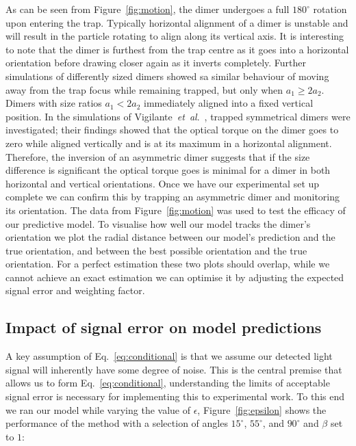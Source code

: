 \documentclass[final, 3p]{elsarticle}
\begin{document}
As can be seen from Figure~\ref{fig:motion}, the dimer undergoes a full $180^{\circ}$ rotation upon entering the trap.  Typically horizontal alignment of a dimer is unstable and will result in the particle rotating to align along its vertical axis.  It is interesting to note that the dimer is furthest from the trap centre as it goes into a horizontal orientation before drawing closer again as it inverts completely. Further simulations of differently sized dimers showed sa similar behaviour of moving away from the trap focus while remaining trapped, but only when $a_1 \geq 2a_2$.  Dimers with size ratios $a_1 < 2a_2$ immediately aligned into a fixed vertical position.
%
In the simulations of Vigilante~\emph{et~al}.\ \cite{Vigilante2020Brownian_OT}, trapped symmetrical dimers were investigated; their findings showed that the optical torque on the dimer goes to zero while aligned vertically and is at its maximum in a horizontal alignment.  Therefore, the inversion of an asymmetric dimer suggests that if the size difference is significant the optical torque goes is minimal for a dimer in both horizontal and vertical orientations. Once we have our experimental set up complete we can confirm this by trapping an asymmetric dimer and monitoring its orientation.  The data from Figure~\ref{fig:motion} was used to test the efficacy of our predictive model.  To visualise how well our model tracks the dimer's orientation we plot the radial distance between our model's prediction and the true orientation, and between the best possible orientation and the true orientation.  For a perfect estimation these two plots should overlap, while we cannot achieve an exact estimation we can optimise it by adjusting the expected signal error and weighting factor.


\subsection{Impact of signal error on model predictions}
\label{sec:epsilon}

A key assumption of Eq.~\eqref{eq:conditional} is that we assume our detected light signal will inherently have some degree of noise. This is the central premise that allows us to form Eq.~\eqref{eq:conditional}, understanding the limits of acceptable signal error is necessary for implementing this to experimental work. To this end we ran our model while varying the value of $\epsilon$, Figure~\ref{fig:epsilon} shows the performance of the method with a selection of angles $15^{\circ}$, $55^{\circ}$, and $90^{\circ}$ and $\beta$ set to $1$:
\end{document}
